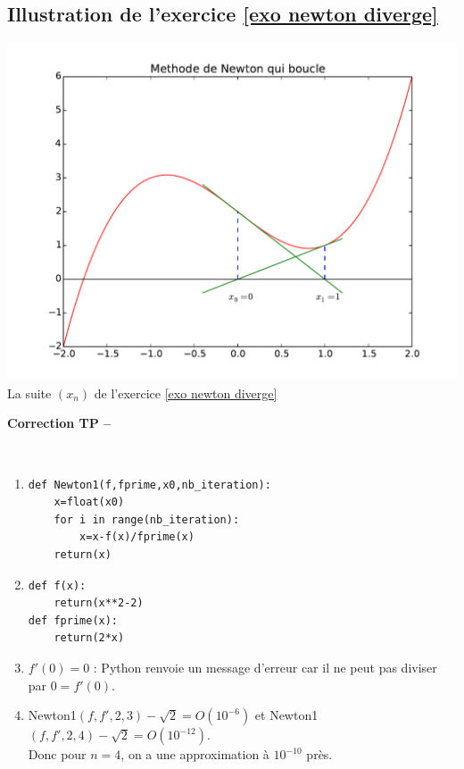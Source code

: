\subsection{Illustration de l'exercice  \ref{exo newton diverge}}
\begin{center}
\includegraphics[scale=0.5]{Dessin/Newton_boucle.pdf}\\
La suite $(x_n)$ de l'exercice \ref{exo newton diverge}
\end{center}





\ifdef{\public}{}{}

\newpage 

\begin{center}
{\Large\bf Correction TP \no {\numero} -- \descrip}
\end{center}


\begin{solution}~\\
\vspace*{-0.7cm}
\begin{enumerate}
\item \begin{verbatim}
def Newton1(f,fprime,x0,nb_iteration):
    x=float(x0)
    for i in range(nb_iteration):
        x=x-f(x)/fprime(x)
    return(x) 
\end{verbatim}
\item \begin{verbatim}
def f(x):
    return(x**2-2)
def fprime(x):
    return(2*x)
\end{verbatim}
\item $f'(0)=0$ : Python renvoie un message d'erreur car il ne peut pas diviser par $0=f'(0)$.
\item Newton1$(f,f',2,3)-\sqrt{2}=O( 10^{-6})$ et Newton1$(f,f',2,4)-\sqrt{2}=O( 10^{-12})$.\\
Donc pour $n=4$, on a une approximation \` a $10^{-10}$ pr\` es.
\end{enumerate}
\end{solution}

